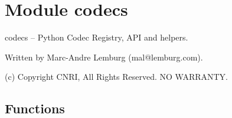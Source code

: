 %
%
%


\section{Module codecs}

    \label{codecs}
codecs -- Python Codec Registry, API and helpers.

Written by Marc-Andre Lemburg (mal@lemburg.com).

(c) Copyright CNRI, All Rights Reserved. NO WARRANTY.



  \subsection{Functions}

    \label{codecs:EncodedFile}

    \vspace{0.5ex}

